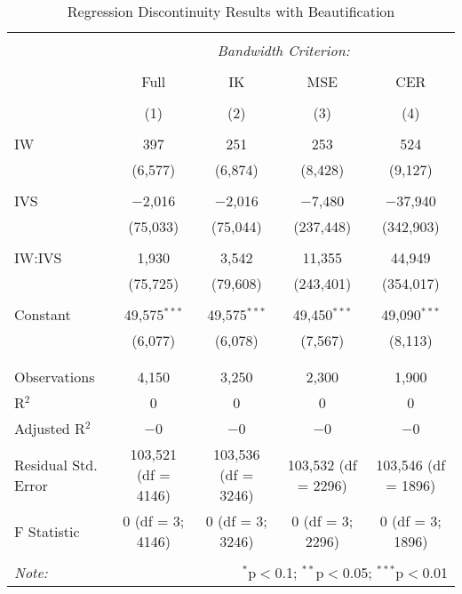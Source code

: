 \begin{table}[H] \centering 
  \caption{ Regression Discontinuity Results with Beautification} 
  \label{} 
\small 
\begin{tabular}{lcccc} 
\\[-1.8ex]\hline 
\hline \\[-1.8ex] 
 & \multicolumn{4}{c}{\textit{Bandwidth Criterion:}} \\ 
\cline{2-5} 
\\
 & Full & IK & MSE & CER \\ 
\\[-1.8ex] & (1) & (2) & (3) & (4)\\ 
\hline \\[-1.8ex] 
 IW & 397 & 251 & 253 & 524 \\ 
  & (6,577) & (6,874) & (8,428) & (9,127) \\ 
  & & & & \\ 
 IVS & $-$2,016 & $-$2,016 & $-$7,480 & $-$37,940 \\ 
  & (75,033) & (75,044) & (237,448) & (342,903) \\ 
  & & & & \\ 
 IW:IVS & 1,930 & 3,542 & 11,355 & 44,949 \\ 
  & (75,725) & (79,608) & (243,401) & (354,017) \\ 
  & & & & \\ 
 Constant & 49,575$^{***}$ & 49,575$^{***}$ & 49,450$^{***}$ & 49,090$^{***}$ \\ 
  & (6,077) & (6,078) & (7,567) & (8,113) \\ 
  & & & & \\ 
\hline \\[-1.8ex] 
Observations & 4,150 & 3,250 & 2,300 & 1,900 \\ 
R$^{2}$ & 0 & 0 & 0 & 0 \\ 
Adjusted R$^{2}$ & $-$0 & $-$0 & $-$0 & $-$0 \\ 
Residual Std. Error & 103,521 (df = 4146) & 103,536 (df = 3246) & 103,532 (df = 2296) & 103,546 (df = 1896) \\ 
F Statistic & 0 (df = 3; 4146) & 0 (df = 3; 3246) & 0 (df = 3; 2296) & 0 (df = 3; 1896) \\ 
\hline 
\hline \\[-1.8ex] 
\textit{Note:}  & \multicolumn{4}{r}{$^{*}$p$<$0.1; $^{**}$p$<$0.05; $^{***}$p$<$0.01} \\ 
\end{tabular} 
\end{table} 

